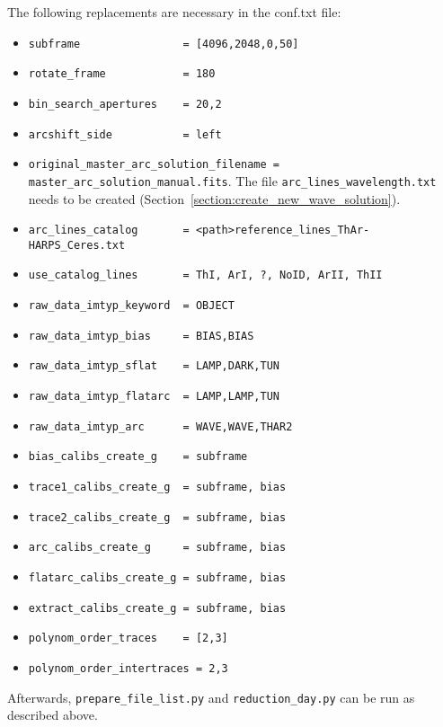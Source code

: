\documentclass[10pt,a4paper]{article}
\begin{document}
\noindent The following replacements are necessary in the conf.txt file:
\begin{itemize}\setlength\itemsep{0em}
  \small
  \item \verb|subframe                = [4096,2048,0,50]|
  \item \verb|rotate_frame            = 180|
  \item \verb|bin_search_apertures    = 20,2|
  \item \verb|arcshift_side           = left|
  \item \verb|original_master_arc_solution_filename = master_arc_solution_manual.fits|. The file \verb|arc_lines_wavelength.txt| needs to be created (Section~\ref{section:create_new_wave_solution}).
  \item \verb|arc_lines_catalog 	  = <path>reference_lines_ThAr-HARPS_Ceres.txt|
  \item \verb|use_catalog_lines 	  = ThI, ArI, ?, NoID, ArII, ThII|
  \item \verb|raw_data_imtyp_keyword  = OBJECT|
  \item \verb|raw_data_imtyp_bias     = BIAS,BIAS|
  \item \verb|raw_data_imtyp_sflat    = LAMP,DARK,TUN|
  \item \verb|raw_data_imtyp_flatarc  = LAMP,LAMP,TUN|
  \item \verb|raw_data_imtyp_arc      = WAVE,WAVE,THAR2|
  \item \verb|bias_calibs_create_g    = subframe|
  \item \verb|trace1_calibs_create_g  = subframe, bias|
  \item \verb|trace2_calibs_create_g  = subframe, bias|
  \item \verb|arc_calibs_create_g     = subframe, bias|
  \item \verb|flatarc_calibs_create_g = subframe, bias|
  \item \verb|extract_calibs_create_g = subframe, bias|
  \item \verb|polynom_order_traces    = [2,3]|
  \item \verb|polynom_order_intertraces = 2,3|
\end{itemize}

\noindent Afterwards, \verb|prepare_file_list.py| and \verb|reduction_day.py| can be run as described above.
\end{document}

